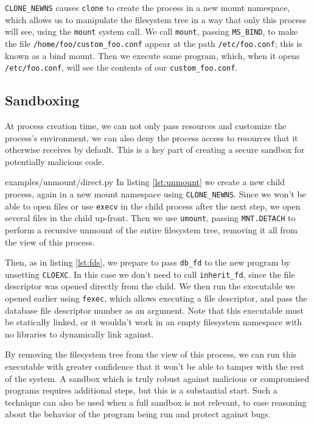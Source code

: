 \documentclass[letterpaper,twocolumn,10pt]{article}
\begin{document}
\verb|CLONE_NEWNS| causes \texttt{clone} to create the process in a new mount namespace,
which allows us to manipulate the filesystem tree in a way that only this process will see,
using the \texttt{mount} system call\cite{mount_namespaces}\cite{clone}.
We call \texttt{mount}, passing \texttt{MS\_BIND}, to make the file \verb|/home/foo/custom_foo.conf|
appear at the path \verb|/etc/foo.conf|;
this is known as a bind mount\cite{mount}.
Then we execute some program,
which, when it opens \verb|/etc/foo.conf|, will see the contents of our \verb|custom_foo.conf|.
\subsection{Sandboxing}
At process creation time,
we can not only pass resources and customize the process's environment,
we can also deny the process access to resources that it otherwise receives by default.
This is a key part of creating a secure sandbox for potentially malicious code\cite{seccomp}\cite{firejail}\cite{gvisor}.


{examples/unmount/direct.py}
In listing \ref{lst:unmount}
we create a new child process,
again in a new mount namespace using \verb|CLONE_NEWNS|.
Since we won't be able to open files or use \texttt{execv} in the child process after the next step,
we open several files in the child up-front.
Then we use \texttt{umount},
passing \texttt{MNT.DETACH} to perform a recursive unmount of the entire filesystem tree,
removing it all from the view of this process.

Then, as in listing \ref{lst:fds}, we prepare to pass \texttt{db\_fd} to the new program by unsetting \texttt{CLOEXC}.
In this case we don't need to call \verb|inherit_fd|,
since the file descriptor was opened directly from the child.
We then run the executable we opened earlier using \texttt{fexec},
which allows executing a file descriptor,
and pass the database file descriptor number as an argument\cite{execveat}.
Note that this executable must be statically linked,
or it wouldn't work in an empty filesystem namespace
with no libraries to dynamically link against.

By removing the filesystem tree from the view of this process,
we can run this executable with greater confidence
that it won't be able to tamper with the rest of the system.
A sandbox which is truly robust against malicious or compromised programs requires additional steps,
but this is a substantial start\cite{firejail}\cite{gvisor}.
Such a technique can also be used when a full sandbox is not relevant,
to ease reasoning about the behavior of the program being run
and protect against bugs.
\end{document}
